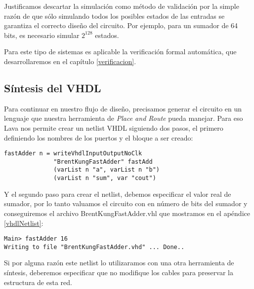 Justificamos descartar la simulación como método de validación por la simple razón de que sólo simulando todos los posibles estados de las entradas se garantiza el correcto diseño del circuito. Por ejemplo, para un sumador de 64 bits, es necesario simular $2^{128}$ estados.

Para este tipo de sistemas es aplicable la verificación formal automática, que desarrollaremos en el capítulo \ref{verificacion}.

\subsection{Síntesis del  VHDL}

Para continuar en nuestro flujo de diseño, precisamos generar el circuito en un lenguaje que nuestra herramienta de \emph{Place and Route} pueda manejar. Para eso Lava nos permite crear un netlist VHDL siguiendo dos pasos, el primero definiendo los nombres de los puertos y el bloque a ser creado:
\begin{lstlisting}
fastAdder n = writeVhdlInputOutputNoClk
              "BrentKungFastAdder" fastAdd
              (varList n "a", varList n "b")
              (varList n "sum", var "cout")
\end{lstlisting}

Y el segundo paso para crear el netlist, debemos especificar el valor real de sumador, por lo tanto valuamos el circuito con en número de bits del sumador y conseguiremos el archivo BrentKungFastAdder.vhl que mostramos en el apéndice \ref{vhdlNetlist}:
\begin{lstlisting}
Main> fastAdder 16
Writing to file "BrentKungFastAdder.vhd" ... Done..
\end{lstlisting}

\noindent Si por alguna razón este netlist lo utilizaramos con una otra herramienta de síntesis, deberemos especificar que no modifique los cables para preservar la estructura de esta red.

